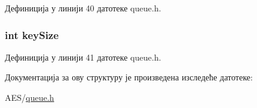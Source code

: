 Дефиниција у линији 40 датотеке queue.\+h.

\hypertarget{struct_queue_key_a8f871ab46f8b469403161ddc86439093}{
\subsubsection[{key\+Size}]{\setlength{\rightskip}{0pt plus 5cm}int key\+Size}}\label{struct_queue_key_a8f871ab46f8b469403161ddc86439093}


Дефиниција у линији 41 датотеке queue.\+h.



Документација за ову структуру је произведена изследеће датотеке\+:\begin{DoxyCompactItemize}
\item 
A\+E\+S/\hyperlink{queue_8h}{queue.\+h}\end{DoxyCompactItemize}

